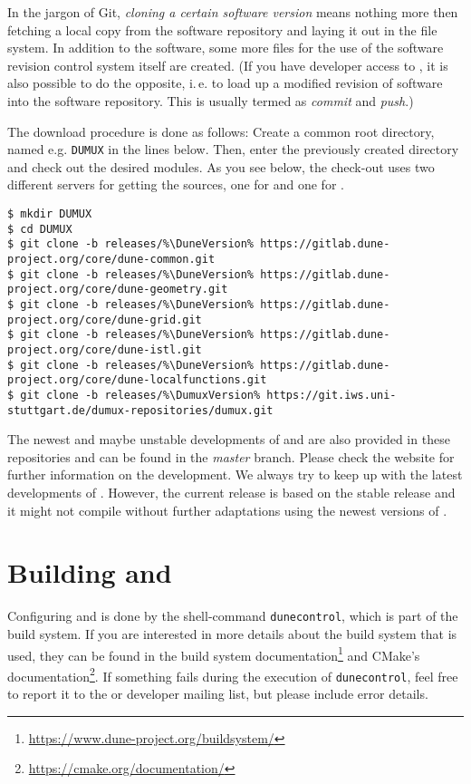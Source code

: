 In the jargon of Git, \emph{cloning a certain software version} means nothing more then fetching
a local copy from the software repository and laying it out in the file system.
In addition to the software, some more files for the use of the software revision
control system itself are created. (If you have developer access to \Dumux, it is
also possible to do the opposite, i.\,e. to load up a modified revision of software
into the software repository. This is usually termed as \emph{commit} and \emph{push}.)

The download procedure is done as follows:
Create a common root directory, named e.g. \texttt{DUMUX} in the lines below.
Then, enter the previously created directory and check out the desired modules.
As you see below, the check-out uses two different servers for getting the sources,
one for \Dune and one for \Dumux.

\begin{lstlisting}[style=Bash,escapechar=\%]
$ mkdir DUMUX
$ cd DUMUX
$ git clone -b releases/%\DuneVersion% https://gitlab.dune-project.org/core/dune-common.git
$ git clone -b releases/%\DuneVersion% https://gitlab.dune-project.org/core/dune-geometry.git
$ git clone -b releases/%\DuneVersion% https://gitlab.dune-project.org/core/dune-grid.git
$ git clone -b releases/%\DuneVersion% https://gitlab.dune-project.org/core/dune-istl.git
$ git clone -b releases/%\DuneVersion% https://gitlab.dune-project.org/core/dune-localfunctions.git
$ git clone -b releases/%\DumuxVersion% https://git.iws.uni-stuttgart.de/dumux-repositories/dumux.git
\end{lstlisting}

The newest and maybe unstable developments of \Dune and \Dumux are also provided in these repositories and can be found in the \emph{master} branch.
Please check the \Dune website \cite{DUNE-HP} for further information on the \Dune development. We always try to keep up with the latest developments of \Dune.
However, the current \Dumux release is based on the stable \DuneVersion{} release and it might not compile without further adaptations using the newest versions of \Dune.

\section{Building \Dune and \Dumux}
\label{buildIt}
Configuring \Dune and \Dumux is done by the shell-command \texttt{dunecontrol}, which is part of the \Dune build system.
If you are interested in more details about the build system that is used,
they can be found in the \Dune build system documentation\footnote{\url{https://www.dune-project.org/buildsystem/}} and
CMake's documentation\footnote{\url{https://cmake.org/documentation/}}.
If something fails during the execution of \texttt{dunecontrol}, feel free to report it to the \Dune or \Dumux developer mailing list,
but please include error details.


